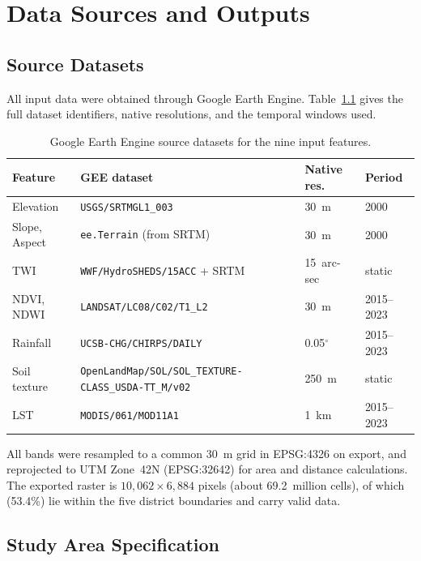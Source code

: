 \chapter{Data Sources and Outputs}
\label{app:data}

\section{Source Datasets}
\label{app:sources}

All input data were obtained through Google Earth Engine. Table~\ref{tab:gee_full}
gives the full dataset identifiers, native resolutions, and the temporal windows
used.

\begin{table}[H]
\centering
\caption{Google Earth Engine source datasets for the nine input features.}
\label{tab:gee_full}
\small
\begin{tabular}{p{2.3cm} p{5.4cm} p{2.2cm} p{2.6cm}}
\toprule
Feature & GEE dataset & Native res. & Period \\
\midrule
Elevation & \texttt{USGS/SRTMGL1\_003} & 30~m & 2000 \\
Slope, Aspect & \texttt{ee.Terrain} (from SRTM) & 30~m & 2000 \\
TWI & \texttt{WWF/HydroSHEDS/15ACC} + SRTM & 15~arc-sec & static \\
NDVI, NDWI & \texttt{LANDSAT/LC08/C02/T1\_L2} & 30~m & 2015--2023 \\
Rainfall & \texttt{UCSB-CHG/CHIRPS/DAILY} & 0.05$^\circ$ & 2015--2023 \\
Soil texture & \texttt{OpenLandMap/SOL/SOL\_TEXTURE-CLASS\_USDA-TT\_M/v02} & 250~m & static \\
LST & \texttt{MODIS/061/MOD11A1} & 1~km & 2015--2023 \\
\bottomrule
\end{tabular}
\end{table}

All bands were resampled to a common 30~m grid in EPSG:4326 on export, and
reprojected to UTM Zone~42N (EPSG:32642) for area and distance calculations. The
exported raster is $10{,}062 \times 6{,}884$ pixels (about 69.2~million cells), of
which \npixels{} (53.4\%) lie within the five district boundaries and carry valid
data.

\section{Study Area Specification}
\label{app:area}

